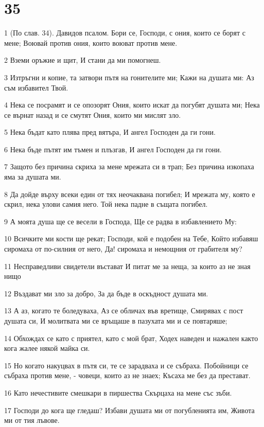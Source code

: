 \chapter{35}

\par 1 (По слав. 34). Давидов псалом. Бори се, Господи, с ония, които се борят с мене; Воювай против ония, които воюват против мене.
\par 2 Вземи оръжие и щит, И стани да ми помогнеш.
\par 3 Изтръгни и копие, та затвори пътя на гонителите ми; Кажи на душата ми: Аз съм избавител Твой.
\par 4 Нека се посрамят и се опозорят Ония, които искат да погубят душата ми; Нека се върнат назад и се смутят Ония, които ми мислят зло.
\par 5 Нека бъдат като плява пред вятъра, И ангел Господен да ги гони.
\par 6 Нека бъде пътят им тъмен и плъзгав, И ангел Господен да ги гони.
\par 7 Защото без причина скриха за мене мрежата си в трап; Без причина изкопаха яма за душата ми.
\par 8 Да дойде върху всеки един от тях неочаквана погибел; И мрежата му, която е скрил, нека улови самия него. Той нека падне в същата погибел.
\par 9 А моята душа ще се весели в Господа, Ще се радва в избавлението Му:
\par 10 Всичките ми кости ще рекат; Господи, кой е подобен на Тебе, Който избавяш сиромаха от по-силния от него, Да! сиромаха и немощния от грабителя му?
\par 11 Несправедливи свидетели въстават И питат ме за неща, за които аз не зная нищо
\par 12 Въздават ми зло за добро, За да бъде в оскъдност душата ми.
\par 13 А аз, когато те боледуваха, Аз се обличах във вретище, Смирявах с пост душата си, И молитвата ми се връщаше в пазухата ми и се повтаряше;
\par 14 Обхождах се като с приятел, като с мой брат, Ходех наведен и нажален както кога жалее някой майка си.
\par 15 Но когато накуцвах в пътя си, те се зарадваха и се събраха. Побойници се събраха против мене, - човеци, които аз не знаех; Късаха ме без да престават.
\par 16 Като нечестивите смешкари в пиршества Скърцаха на мене със зъби.
\par 17 Господи до кога ще гледаш? Избави душата ми от погубленията им, Живота ми от тия лъвове.
